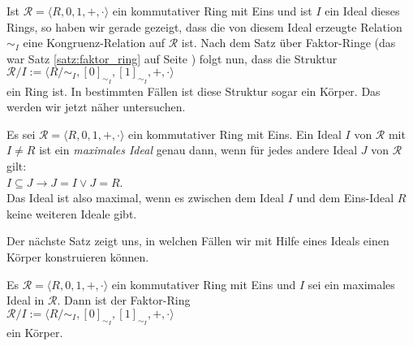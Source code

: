 Ist $\mathcal{R} = \langle R, 0, 1, +, \cdot \rangle$ ein kommutativer Ring mit Eins und ist $I$ ein
Ideal dieses Rings, so haben wir gerade gezeigt, dass die von diesem Ideal erzeugte Relation $\sim_I$
eine Kongruenz-Relation auf $\mathcal{R}$ ist.  Nach dem Satz über Faktor-Ringe
(das war Satz \ref{satz:faktor_ring} auf Seite \pageref{satz:faktor_ring}) folgt nun, dass die Struktur
\\[0.2cm]
\hspace*{1.3cm}
 $\mathcal{R}/I := \langle R/\!\sim_I, [0]_{\sim_I}, [1]_{\sim_I}, +, \cdot \rangle$
\\[0.2cm]
ein Ring ist.  In bestimmten Fällen ist diese Struktur sogar ein Körper.  Das werden wir jetzt näher
untersuchen.

\begin{Definition}
  Es sei $\mathcal{R} = \langle R, 0, 1, +, \cdot \rangle$ ein kommutativer Ring mit Eins.  Ein Ideal
  $I$ von $\mathcal{R}$ mit $I \not= R$ ist ein \emph{maximales Ideal} genau dann, wenn für jedes andere Ideal
  $J$ von $\mathcal{R}$ gilt:
  \\[0.2cm]
  \hspace*{1.3cm}
  $I \subseteq J \rightarrow J = I \vee J = R$.
  \\[0.2cm]
  Das Ideal ist also maximal, wenn es zwischen dem Ideal $I$ und dem Eins-Ideal $R$ keine 
  weiteren Ideale gibt.
  \eox
\end{Definition}

Der nächste Satz zeigt uns, in welchen Fällen wir mit Hilfe eines Ideals einen Körper konstruieren
können. 
\begin{Satz} \lb
  Es $\mathcal{R} = \langle R, 0, 1, +, \cdot \rangle$ ein kommutativer Ring mit Eins und
  $I$ sei ein maximales Ideal in $\mathcal{R}$.  Dann ist der Faktor-Ring
  \\[0.2cm]
  \hspace*{1.3cm}
  $\mathcal{R}/I := \langle R/\!\sim_I, [0]_{\sim_I}, [1]_{\sim_I}, +, \cdot \rangle$
  \\[0.2cm]
  ein Körper.
\end{Satz}

